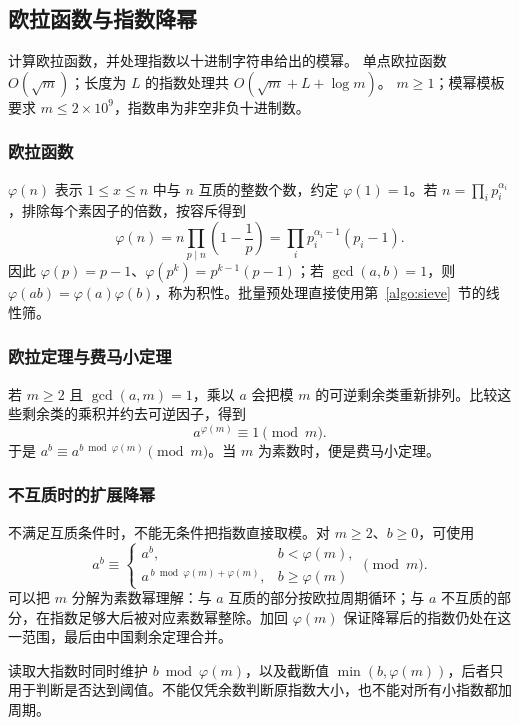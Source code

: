\subsection{欧拉函数与指数降幂}
\label{algo:euler}
\AlgorithmInfo
    {计算欧拉函数，并处理指数以十进制字符串给出的模幂。}
    {单点欧拉函数 $O(\sqrt m)$；长度为 $L$ 的指数处理共 $O(\sqrt m+L+\log m)$。}
    {$m\geq1$；模幂模板要求 $m\leq2\times10^9$，指数串为非空非负十进制数。}

\subsubsection*{欧拉函数}
$\varphi(n)$ 表示 $1\leq x\leq n$ 中与 $n$ 互质的整数个数，约定 $\varphi(1)=1$。若 $n=\prod_i p_i^{\alpha_i}$，排除每个素因子的倍数，按容斥得到
\[
    \varphi(n)=n\prod_{p\mid n}\left(1-\frac1p\right)
    =\prod_i p_i^{\alpha_i-1}(p_i-1).
\]
因此 $\varphi(p)=p-1$、$\varphi(p^k)=p^{k-1}(p-1)$；若 $\gcd(a,b)=1$，则 $\varphi(ab)=\varphi(a)\varphi(b)$，称为积性。批量预处理直接使用第~\ref{algo:sieve}~节的线性筛。

\subsubsection*{欧拉定理与费马小定理}
若 $m\geq2$ 且 $\gcd(a,m)=1$，乘以 $a$ 会把模 $m$ 的可逆剩余类重新排列。比较这些剩余类的乘积并约去可逆因子，得到
\[
    a^{\varphi(m)}\equiv1\pmod m.
\]
于是 $a^b\equiv a^{b\bmod\varphi(m)}\pmod m$。当 $m$ 为素数时，便是费马小定理。

\subsubsection*{不互质时的扩展降幂}
不满足互质条件时，不能无条件把指数直接取模。对 $m\geq2$、$b\geq0$，可使用
\[
    a^b\equiv
    \begin{cases}
        a^b,&b<\varphi(m),\\
        a^{\,b\bmod\varphi(m)+\varphi(m)},&b\geq\varphi(m)
    \end{cases}\pmod m.
\]
可以把 $m$ 分解为素数幂理解：与 $a$ 互质的部分按欧拉周期循环；与 $a$ 不互质的部分，在指数足够大后被对应素数幂整除。加回 $\varphi(m)$ 保证降幂后的指数仍处在这一范围，最后由中国剩余定理合并。

读取大指数时同时维护 $b\bmod\varphi(m)$，以及截断值 $\min(b,\varphi(m))$，后者只用于判断是否达到阈值。不能仅凭余数判断原指数大小，也不能对所有小指数都加周期。

